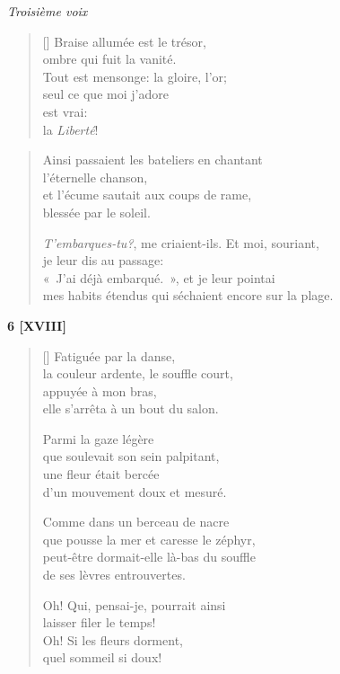 \documentclass[a4paper,12pt]{book}
\begin{document}
\begin{center} \emph{Troisième voix} \end{center}

\begin{verse}[\versewidth]
  Braise allumée est le trésor, \\
  ombre qui fuit la vanité. \\
  Tout est mensonge: la gloire, l'or; \\
  seul ce que moi j'adore \\
  est vrai: \\
  la \emph{Liberté}!
\end{verse}

\begin{verse}
  Ainsi passaient les bateliers en chantant \\
  l'éternelle chanson, \\
  et l'écume sautait aux coups de rame, \\
  blessée par le soleil.

  \emph{T'embarques-tu?}, me criaient-ils. Et moi, souriant, \\
  je leur dis au passage: \\
  «~J'ai déjà embarqué.~», et je leur pointai \\
  mes habits étendus qui séchaient encore sur la plage.
\end{verse}

\bigskip

\begin{center}
  \textbf{6 [XVIII]}
\end{center}

\settowidth{\versewidth}{que pousse la mer et caresse le zéphir,}

\begin{verse}[\versewidth]
  Fatiguée par la danse, \\
  la couleur ardente, le souffle court, \\
  appuyée à mon bras, \\
  elle s'arrêta à un bout du salon.

  Parmi la gaze légère \\
  que soulevait son sein palpitant, \\
  une fleur était bercée \\
  d'un mouvement doux et mesuré.

  Comme dans un berceau de nacre \\
  que pousse la mer et caresse le zéphyr, \\
  peut-être dormait-elle là-bas du souffle \\
  de ses lèvres entrouvertes.

  Oh! Qui, pensai-je, pourrait ainsi \\
  laisser filer le temps! \\
  Oh! Si les fleurs dorment, \\
  quel sommeil si doux!
\end{verse}
\end{document}
